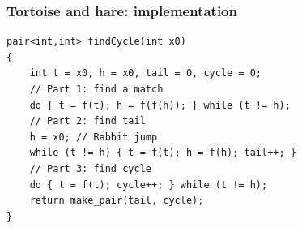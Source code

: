 \documentclass[12pt]{beamer}
\begin{document}
\begin{frame}[fragile]
\frametitle{Tortoise and hare: implementation}
\begin{lstlisting}[frame=single]
pair<int,int> findCycle(int x0)
{
    int t = x0, h = x0, tail = 0, cycle = 0;
    // Part 1: find a match
    do { t = f(t); h = f(f(h)); } while (t != h);
    // Part 2: find tail
    h = x0; // Rabbit jump
    while (t != h) { t = f(t); h = f(h); tail++; }
    // Part 3: find cycle
    do { t = f(t); cycle++; } while (t != h);
    return make_pair(tail, cycle);
}
\end{lstlisting}
\end{frame}
\end{document}
